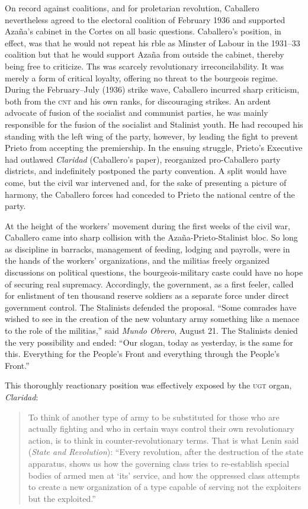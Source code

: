 On record against coalitions, and for proletarian revolution, Caballero nevertheless agreed to the electoral coalition of February 1936 and supported Azaña’s cabinet in the Cortes on all basic questions. Caballero’s position, in effect, was that he would not repeat his rble as Minster of Labour in the 1931–33 coalition but that he would support Azaña from outside the cabinet, thereby being free to criticize. Ths was scarcely revolutionary irreconcilability. It was merely a form of critical loyalty, offering no threat to the bourgeois regime. During the February–July (1936) strike wave, Caballero incurred sharp criticism, both from the \textsc{cnt} and his own ranks, for discouraging strikes. An ardent advocate of fusion of the socialist and communist parties, he was mainly responsible for the fusion of the socialist and Stalinist youth. He had recouped his standing with the left wing of the party, however, by leading the fight to prevent Prieto from accepting the premiership. In the ensuing struggle, Prieto’s Executive had outlawed \emph{Claridad} (Caballero’s paper), reorganized pro-Caballero party districts, and indefinitely postponed the party convention. A split would have come, but the civil war intervened and, for the sake of presenting a picture of harmony, the Caballero forces had conceded to Prieto the national centre of the party.

At the height of the workers’ movement during the first weeks of the civil war, Caballero came into sharp collision with the Azaña-Prieto-Stalinist bloc. So long as discipline in barracks, management of feeding, lodging and payrolls, were in the hands of the workers’ organizations, and the militias freely organized discussions on political questions, the bourgeois-military caste could have no hope of securing real supremacy. Accordingly, the government, as a first feeler, called for enlistment of ten thousand reserve soldiers as a separate force under direct government control. The Stalinists defended the proposal. ``Some comrades have wished to see in the creation of the new voluntary army something like a menace to the role of the militias,'' said \emph{Mundo Obrero}, August 21. The Stalinists denied the very possibility and ended: ``Our slogan, today as yesterday, is the same for this. Everything for the People’s Front and everything through the People’s Front.''

This thoroughly reactionary position was effectively exposed by the \textsc{ugt} organ, \emph{Claridad}:

\begin{quotation}
  To think of another type of army to be substituted for those who are actually fighting and who in certain ways control their own revolutionary action, is to think in counter-revolutionary terms. That is what Lenin said (\emph{State and Revolution}): ``Every revolution, after the destruction of the state apparatus, shows us how the governing class tries to re-establish special bodies of armed men at `its' service, and how the oppressed class attempts to create a new organization of a type capable of serving not the exploiters but the exploited.''
\end{quotation}

